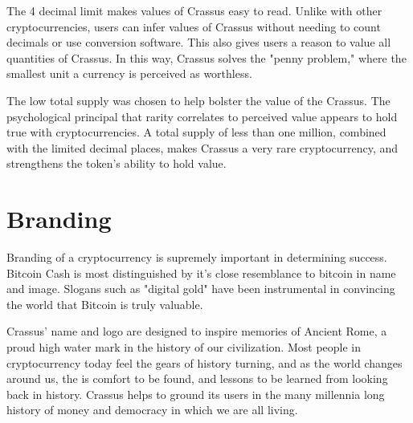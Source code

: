 \documentclass[12pt]{article}
\begin{document}
The 4 decimal limit makes values of Crassus easy to read.  Unlike with other cryptocurrencies, users can infer values of Crassus without needing to count decimals or use conversion software.  This also gives users a reason to value all quantities of Crassus.  In this way, Crassus solves the "penny problem," where the smallest unit a currency is perceived as worthless.

The low total supply was chosen to help bolster the value of the Crassus.  The psychological principal that rarity correlates to perceived value appears to hold true with cryptocurrencies.  A total supply of less than one million, combined with the limited decimal places, makes Crassus a very rare cryptocurrency, and strengthens the token's ability to hold value.


\section{Branding}\label{Branding}
Branding of a cryptocurrency is supremely important in determining success.  Bitcoin Cash is most distinguished by it's close resemblance to bitcoin in name and image.  Slogans such as "digital gold" have been instrumental in convincing the world that Bitcoin is truly valuable.

Crassus' name and logo are designed to inspire memories of Ancient Rome, a proud high water mark in the history of our civilization.  Most people in cryptocurrency today feel the gears of history turning, and as the world changes around us, the is comfort to be found, and lessons to be learned from looking back in history.  Crassus helps to ground its users in the many millennia long history of money and democracy in which we are all living.



\end{document}
